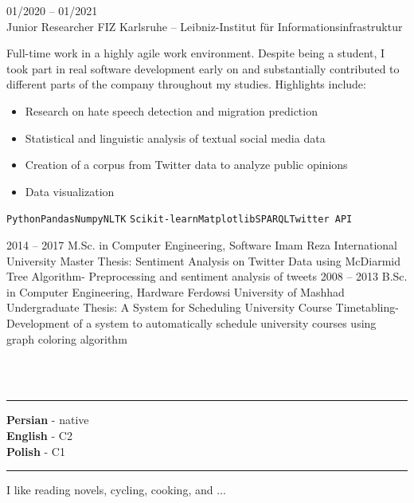 \documentclass[9pt]{developercv} %
\begin{document}
\begin{entrylist}
{        }
    	\entry
    		{01/2020 -- 01/2021\\}
    		{Junior Researcher}
    		{FIZ Karlsruhe – Leibniz-Institut für Informationsinfrastruktur}
    		{Full-time work in a highly agile work environment. Despite being a student, I took part in real software development early on and substantially contributed to different parts of the company throughout my studies. Highlights include:
            \begin{itemize}
                \item Research on hate speech detection and migration prediction
                \item Statistical and linguistic analysis of textual social media data
                \item Creation of a corpus from Twitter data to analyze public opinions
                \item Data visualization
            \end{itemize}
            \texttt{Python}\slashsep\texttt{Pandas}\slashsep\texttt{Numpy}\slashsep\texttt{NLTK}
            \texttt{Scikit-learn}\slashsep\texttt{Matplotlib}\slashsep\texttt{SPARQL}\slashsep\texttt{Twitter API}
            }
    \end{entrylist}


    \pagebreak
	\begin{entrylist}
		\entry
		{2014 – 2017}
		{M.Sc. in Computer Engineering, Software}
		{Imam Reza International University}
		{Master Thesis: Sentiment Analysis on Twitter Data using McDiarmid Tree Algorithm- Preprocessing and sentiment analysis of tweets}
		\entry
		{2008 – 2013}
		{B.Sc. in Computer Engineering, Hardware}
		{Ferdowsi University of Mashhad}
		{Undergraduate Thesis: A System for Scheduling University Course Timetabling- Development of a system to automatically schedule university courses using graph coloring algorithm}
	\end{entrylist}
	\\\\
	\begin{minipage}[t]{0.3\textwidth}\hrule height 0pt width 0pt%
		\textbf{Persian} - native\\
		\textbf{English} - C2\\
		\textbf{Polish} - C1
	\end{minipage}%
	\hspace{0cm}
	\begin{minipage}[t]{0.3\textwidth}\hrule height 0pt width 0pt%
		I like reading novels, cycling, cooking, and ...
	\end{minipage}%
	
\end{document}
